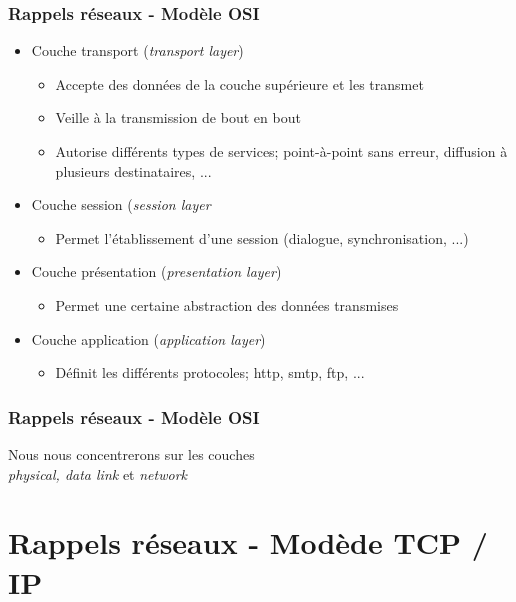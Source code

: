 \begin{frame}[fragile]
  \frametitle{Rappels réseaux - Modèle OSI}
\begin{itemize}
	\item Couche transport 	(\textit{transport layer})
	\begin{itemize}
		\item Accepte des données de la couche supérieure et les transmet
		\item Veille à la transmission de bout en bout
		\item Autorise différents types de services; point-à-point sans erreur, diffusion à plusieurs destinataires, ...
	\end{itemize}
	\item Couche session (\textit{session layer}
	\begin{itemize}
		\item Permet l'établissement d'une session (dialogue, synchronisation, ...)
	\end{itemize}
	\item Couche présentation (\textit{presentation layer})
	\begin{itemize}
		\item Permet une certaine abstraction des données transmises
	\end{itemize}
	\item Couche application (\textit{application layer})
	\begin{itemize}
		\item Définit les différents protocoles; http, smtp, ftp, ...
	\end{itemize}
\end{itemize}
\end{frame}

\begin{frame}[fragile]
  \frametitle{Rappels réseaux - Modèle OSI}
\begin{center}
	{\Large Nous nous concentrerons sur les couches \\ 
	\textit{physical, data link} et \textit{network}}
\end{center}
\end{frame}


\section{Rappels réseaux - Modède TCP / IP}

